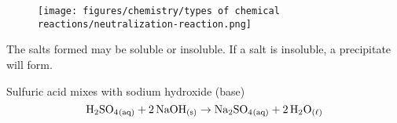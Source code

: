 \documentclass[12pt]{report}
\begin{document}
\begin{figure}[htb!]
\centering
    \texttt{[image: figures/chemistry/types of chemical reactions/neutralization-reaction.png]}
\end{figure}

\begin{remark}{ } 
    The salts formed may be soluble or insoluble. If a salt is insoluble, a precipitate will form. 
\end{remark}

\begin{2example}{ }
    \invis
\begin{list0.5}
    \item{Sulfuric acid mixes with sodium hydroxide (base)
            \[
                \ce{H2SO4_{(aq)}}+ \ce{2NaOH_{(s)}}\to \ce{Na2SO4_{(aq)}}+ \ce{2H2O_{( \ell )}}
            \]
        }
\end{list0.5} 
\end{2example}
\end{document}
